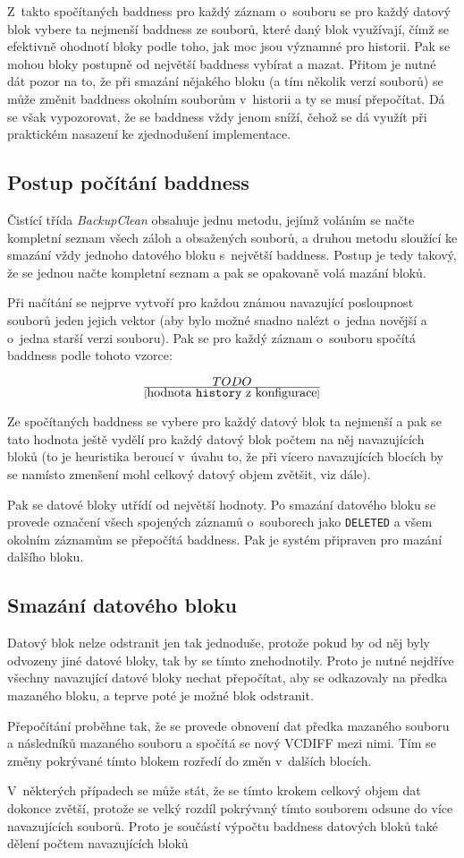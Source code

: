 Z~takto spočítaných baddness pro každý záznam o~souboru se pro každý datový
blok vybere ta nejmenší baddness ze souborů, které daný blok využívají, čímž se
efektivně ohodnotí bloky podle toho, jak moc jsou významné pro historii. Pak se
mohou bloky postupně od největší baddness vybírat a mazat. Přitom je nutné dát
pozor na to, že při smazání nějakého bloku (a tím několik verzí souborů) se
může změnit baddness okolním souborům v~historii a ty se musí přepočítat. Dá se
však vypozorovat, že se baddness vždy jenom sníží, čehož se dá využít při
praktickém nasazení ke zjednodušení implementace.

\subsection{Postup počítání baddness}

Čistící třída {\it BackupClean} obsahuje jednu metodu, jejímž voláním se načte
kompletní seznam všech záloh a obsažených souborů, a druhou metodu sloužící ke
smazání vždy jednoho datového bloku s~největší baddness. Postup je tedy takový,
že se jednou načte kompletní seznam a pak se opakovaně volá mazání bloků.

Při načítání se nejprve vytvoří pro každou známou navazující posloupnost souborů
jeden jejich vektor (aby bylo možné snadno nalézt o~jedna novější a o~jedna
starší verzi souboru). Pak se pro každý záznam o~souboru spočítá baddness podle
tohoto vzorce:

$$TODO\over[\hbox{hodnota \texttt{history} z konfigurace}]$$

Ze spočítaných baddness se vybere pro každý datový blok ta nejmenší a pak se
tato hodnota ještě vydělí pro každý datový blok počtem na něj navazujících bloků
(to je heuristika beroucí v~úvahu to, že při vícero navazujících blocích by se
namísto zmenšení mohl celkový datový objem zvětšit, viz dále).

Pak se datové bloky utřídí od největší hodnoty. Po smazání datového bloku se
provede označení všech spojených záznamů o~souborech jako \texttt{DELETED} a
všem okolním záznamům se přepočítá baddness. Pak je systém připraven pro mazání
dalšího bloku.

\subsection{Smazání datového bloku}

Datový blok nelze odstranit jen tak jednoduše, protože pokud by od něj byly
odvozeny jiné datové bloky, tak by se tímto znehodnotily. Proto je nutné
nejdříve všechny navazující datové bloky nechat přepočítat, aby se odkazovaly
na předka mazaného bloku, a teprve poté je možné blok odstranit.

Přepočítání proběhne tak, že se provede obnovení dat předka mazaného souboru a následníků mazaného souboru a spočítá se nový \gls{VCDIFF} mezi nimi. Tím se
změny pokrývané tímto blokem rozředí do změn v~dalších blocích.

V~některých případech se může stát, že se tímto krokem celkový objem dat dokonce
zvětší, protože se velký rozdíl pokrývaný tímto souborem odsune do více
navazujících souborů. Proto je součástí výpočtu baddness datových bloků také
dělení počtem navazujících bloků
